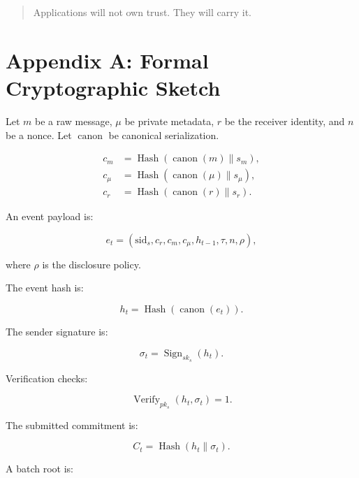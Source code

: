\documentclass[11pt]{article}
\newcommand{\hash}{\operatorname{Hash}}
\newcommand{\sign}{\operatorname{Sign}}
\newcommand{\verify}{\operatorname{Verify}}
\begin{document}
\begin{quote}
Applications will not own trust. They will carry it.
\end{quote}

\section{Appendix A: Formal Cryptographic Sketch}

Let \(m\) be a raw message, \(\mu\) be private metadata, \(r\) be the receiver identity, and \(n\) be a nonce. Let \(\operatorname{canon}\) be canonical serialization.

\begin{align}
    c_m &= \hash(\operatorname{canon}(m) \parallel s_m), \\
    c_\mu &= \hash(\operatorname{canon}(\mu) \parallel s_\mu), \\
    c_r &= \hash(\operatorname{canon}(r) \parallel s_r).
\end{align}

An event payload is:

\begin{equation}
    e_t = (\mathrm{sid}_s, c_r, c_m, c_\mu, h_{t-1}, \tau, n, \rho),
\end{equation}

where \(\rho\) is the disclosure policy.

The event hash is:

\begin{equation}
    h_t = \hash(\operatorname{canon}(e_t)).
\end{equation}

The sender signature is:

\begin{equation}
    \sigma_t = \sign_{sk_s}(h_t).
\end{equation}

Verification checks:

\begin{equation}
    \verify_{pk_s}(h_t, \sigma_t) = 1.
\end{equation}

The submitted commitment is:

\begin{equation}
    C_t = \hash(h_t \parallel \sigma_t).
\end{equation}

A batch root is:
\end{document}
